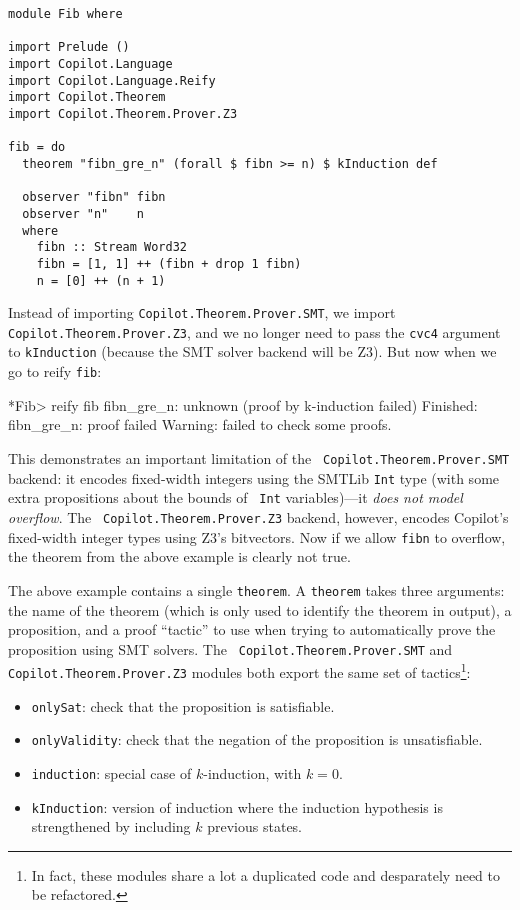 \begin{lstlisting}[language = Copilot]
module Fib where

import Prelude ()
import Copilot.Language
import Copilot.Language.Reify
import Copilot.Theorem
import Copilot.Theorem.Prover.Z3

fib = do
  theorem "fibn_gre_n" (forall $ fibn >= n) $ kInduction def

  observer "fibn" fibn
  observer "n"    n
  where
    fibn :: Stream Word32
    fibn = [1, 1] ++ (fibn + drop 1 fibn)
    n = [0] ++ (n + 1)
\end{lstlisting}

Instead of importing {\tt Copilot.Theorem.Prover.SMT}, we import {\tt
Copilot.Theorem.Prover.Z3}, and we no longer need to pass the {\tt cvc4}
argument to {\tt kInduction} (because the SMT solver backend will be Z3). But
now when we go to reify {\tt fib}:

\begin{code}
*Fib> reify fib
fibn_gre_n: unknown (proof by k-induction failed)
Finished: fibn_gre_n: proof failed
Warning: failed to check some proofs.
\end{code}

This demonstrates an important limitation of the {\tt
Copilot.Theorem.Prover.SMT} backend: it encodes fixed-width integers using the
SMTLib {\tt Int} type (with some extra propositions about the bounds of {\tt
Int} variables)---it {\em does not model overflow}. The {\tt
Copilot.Theorem.Prover.Z3} backend, however, encodes Copilot's fixed-width
integer types using Z3's bitvectors. Now if we allow {\tt fibn} to overflow, the
theorem from the above example is clearly not true.

The above example contains a single {\tt theorem}. A {\tt theorem} takes three
arguments: the name of the theorem (which is only used to identify the theorem
in output), a proposition, and a proof ``tactic'' to use when trying to
automatically prove the proposition using SMT solvers. The {\tt
Copilot.Theorem.Prover.SMT} and {\tt Copilot.Theorem.Prover.Z3} modules both
export the same set of tactics\footnote{In fact, these modules share a lot a
duplicated code and desparately need to be refactored.}:
\begin{itemize}
\item {\tt onlySat}: check that the proposition is satisfiable.
\item {\tt onlyValidity}: check that the negation of the proposition is
unsatisfiable.
\item {\tt induction}: special case of $k$-induction, with $k = 0$.
\item {\tt kInduction}: version of induction where the induction hypothesis is
strengthened by including $k$ previous states.
\end{itemize}

